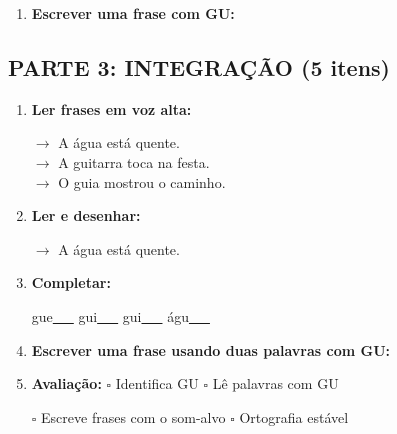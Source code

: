 \begin{exercicio}
\begin{enumerate}[resume]
  \item \textbf{Escrever uma frase com GU:}
  \begin{center}
  \underline{\hspace{12cm}}
  \end{center}

\end{enumerate}

\subsection*{PARTE 3: INTEGRAÇÃO (5 itens)}

\begin{enumerate}[resume]

  \item \textbf{Ler frases em voz alta:}
  \begin{center}
  $\rightarrow$ A água está quente.\\
  $\rightarrow$ A guitarra toca na festa.\\
  $\rightarrow$ O guia mostrou o caminho.\\
  \end{center}

  \item \textbf{Ler e desenhar:}
  \begin{center}
  $\rightarrow$ A água está quente.
  \end{center}
  \begin{center}
  \end{center}

  \item \textbf{Completar:}
  \begin{center}
  gue\underline{~~~} \quad gui\underline{~~~} \quad gui\underline{~~~} \quad águ\underline{~~~}
  \end{center}

  \item \textbf{Escrever uma frase usando duas palavras com GU:}
  \begin{center}
  \underline{\hspace{12cm}}
  \end{center}

  \item \textbf{Avaliação:} $\square$ Identifica GU \quad $\square$ Lê palavras com GU
  \begin{center}
  $\square$ Escreve frases com o som-alvo \quad $\square$ Ortografia estável
  \end{center}


\end{enumerate}
\end{exercicio}
